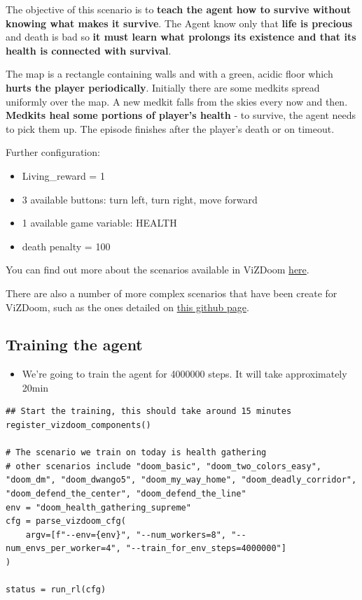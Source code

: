 \documentclass[11pt,a4paper]{article}
\begin{document}
The objective of this scenario is to \textbf{teach the agent how to survive without knowing what makes it survive}. The Agent know only that \textbf{life is precious} and death is bad so \textbf{it must learn what prolongs its existence and that its health is connected with survival}.

The map is a rectangle containing walls and with a green, acidic floor which \textbf{hurts the player periodically}. Initially there are some medkits spread uniformly over the map. A new medkit falls from the skies every now and then. \textbf{Medkits heal some portions of player's health} - to survive, the agent needs to pick them up. The episode finishes after the player's death or on timeout.

Further configuration:

\begin{itemize}
\tightlist
\item
  Living\_reward = 1
\item
  3 available buttons: turn left, turn right, move forward
\item
  1 available game variable: HEALTH
\item
  death penalty = 100
\end{itemize}

You can find out more about the scenarios available in ViZDoom \href{https://github.com/Farama-Foundation/ViZDoom/tree/master/scenarios}{here}.

There are also a number of more complex scenarios that have been create for ViZDoom, such as the ones detailed on \href{https://github.com/edbeeching/3d_control_deep_rl}{this github page}.

\subsection{Training the agent}\label{training-the-agent}

\begin{itemize}
\tightlist
\item
  We're going to train the agent for 4000000 steps. It will take approximately 20min
\end{itemize}

\begin{lstlisting}
## Start the training, this should take around 15 minutes
register_vizdoom_components()

# The scenario we train on today is health gathering
# other scenarios include "doom_basic", "doom_two_colors_easy", "doom_dm", "doom_dwango5", "doom_my_way_home", "doom_deadly_corridor", "doom_defend_the_center", "doom_defend_the_line"
env = "doom_health_gathering_supreme"
cfg = parse_vizdoom_cfg(
    argv=[f"--env={env}", "--num_workers=8", "--num_envs_per_worker=4", "--train_for_env_steps=4000000"]
)

status = run_rl(cfg)
\end{lstlisting}
\end{document}
